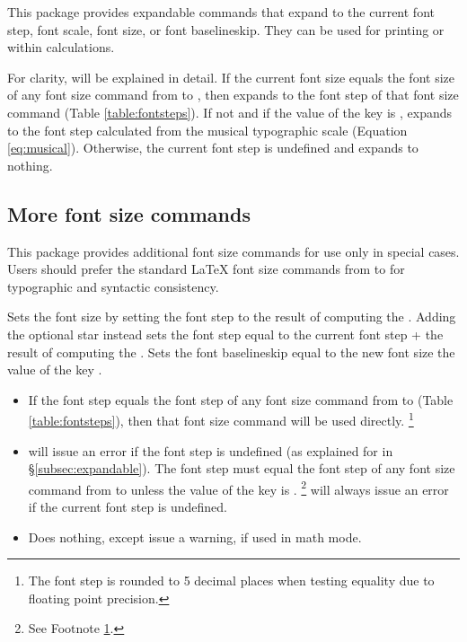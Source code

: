 \documentclass{beery}
\begin{document}
This package provides expandable commands that expand to the current font step, font scale, font size, or font baselineskip.
They can be used for printing or within calculations.

For clarity,  will be explained in detail.
If the current font size equals the font size of any font size command from  to , then  expands to the font step of that font size command (Table \ref{table:fontsteps}).
If not and if the value of the key  is ,  expands to the font step calculated from the musical typographic scale (Equation \ref{eq:musical}).
Otherwise, the current font step is undefined and  expands to nothing.

\subsection{More font size commands}
\label{subsec:fontsize}

This package provides additional font size commands for use only in special cases.
Users should prefer the standard \LaTeX{} font size commands from  to  for typographic and syntactic consistency.

\begin{displaycode}
   \sarg{} 
\end{displaycode}

Sets the font size by setting the font step to the result of computing the .
Adding the optional star \sarg{} instead sets the font step equal to the current font step + the result of computing the .
Sets the font baselineskip equal to the new font size \texttimes{} the value of the key .

\begin{itemize}
  \item
  If the font step equals the font step of any font size command from  to  (Table \ref{table:fontsteps}), then that font size command will be used directly.%
  \footnote
    {
      \label{fn:setfontstep}%
      The font step is rounded to \num{5} decimal places when testing equality due to floating point precision.
    }
  \item
   will issue an error if the font step is undefined (as explained for  in \S\ref{subsec:expandable}).
  The font step must equal the font step of any font size command from  to  unless the value of the key  is .%
  \footnote{See Footnote \ref{fn:setfontstep}.}
   will always issue an error if the current font step is undefined.
  \item
  Does nothing, except issue a warning, if used in math mode.
\end{itemize}
\end{document}
